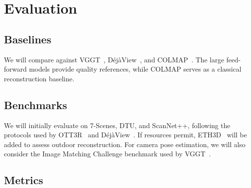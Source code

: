 \section{Evaluation}
\label{sec:eval}

\subsection{Baselines}

We will compare against VGGT~\cite{vggt}, DéjàView~\cite{dejaview}, and COLMAP~\cite{sfm}. The large feed-forward models provide quality references, while COLMAP serves as a classical reconstruction baseline.

\subsection{Benchmarks}

We will initially evaluate on 7-Scenes, DTU, and ScanNet++, following the protocols used by OTT3R~\cite{ott3r} and DéjàView~\cite{dejaview}. If resources permit, ETH3D~\cite{vggt} will be added to assess outdoor reconstruction. For camera pose estimation, we will also consider the Image Matching Challenge benchmark used by VGGT~\cite{vggt}.

\subsection{Metrics}

